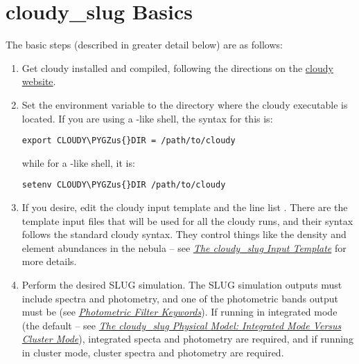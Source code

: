 \documentclass[letterpaper,10pt,english]{sphinxmanual}
\def\PYGZus{\char`\_}
\begin{document}
\section{cloudy\_slug Basics}
\label{cloudy:cloudy-slug-basics}
The basic steps (described in greater detail below) are as follows:
\begin{enumerate}
\item {} 
Get cloudy installed and compiled, following the directions on the
\href{http://nublado.org/}{cloudy website}.

\item {} 
Set the environment variable  to the directory where
the cloudy executable  is located.  If you are using
a -like shell, the syntax for this is:

\begin{Verbatim}[commandchars=\\\{\}]
export CLOUDY\PYGZus{}DIR = /path/to/cloudy
\end{Verbatim}

while for a -like shell, it is:

\begin{Verbatim}[commandchars=\\\{\}]
setenv CLOUDY\PYGZus{}DIR /path/to/cloudy
\end{Verbatim}

\item {} 
If you desire, edit the cloudy input template
 and the line list
. There are the template input files
that will be used for all the cloudy runs, and their syntax follows
the standard cloudy syntax. They control things like the density and
element abundances in the nebula -- see {\hyperref[cloudy:ssec\string-cloudy\string-template]{\emph{The cloudy\_slug Input Template}}}
for more details.

\item {} 
Perform the desired SLUG simulation. The SLUG simulation outputs
must include spectra and photometry, and one of the photometric
bands output must be  (see {\hyperref[parameters:ssec\string-phot\string-keywords]{\emph{Photometric Filter Keywords}}}). If
running in integrated mode (the default -- see
{\hyperref[cloudy:ssec\string-cloudy\string-cluster]{\emph{The cloudy\_slug Physical Model: Integrated Mode Versus Cluster Mode}}}), integrated specta and photometry are
required, and if running in cluster mode, cluster spectra and
photometry are required.


\end{enumerate}
\end{document}
